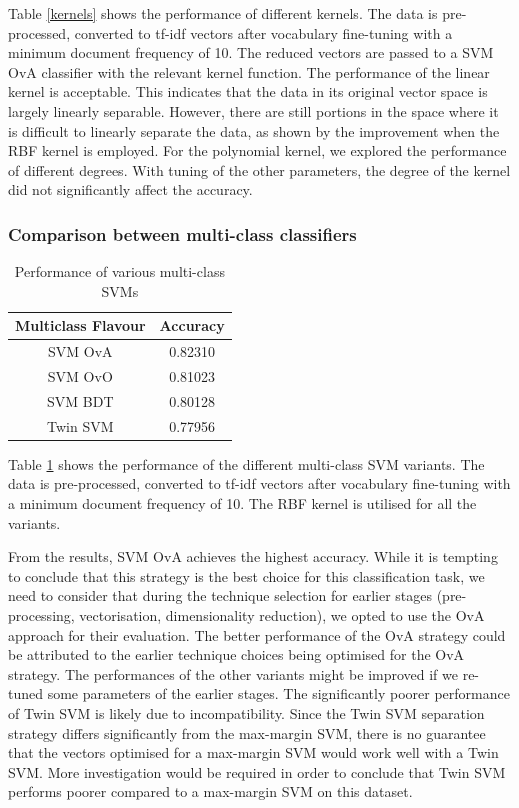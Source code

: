 \documentclass{article}
\begin{document}
Table \ref{kernels} shows the performance of different kernels. The data is pre-processed, converted to tf-idf vectors after vocabulary fine-tuning with a minimum document frequency of 10. The reduced vectors are passed to a SVM OvA classifier with the relevant kernel function. The performance of the linear kernel is acceptable. This indicates that the data in its original vector space is largely linearly separable. However, there are still portions in the space where it is difficult to linearly separate the data, as shown by the improvement when the RBF kernel is employed. For the polynomial kernel, we explored the performance of different degrees. With tuning of the other parameters, the degree of the kernel did not significantly affect the accuracy.

\subsubsection*{Comparison between multi-class classifiers}
\begin{table}[h]
\centering
\begin{tabular}{|c|c|}
\hline
\textbf{Multiclass Flavour} & \textbf{Accuracy} \\ \hline
SVM OvA            & 0.82310  \\ \hline
SVM OvO            & 0.81023  \\ \hline
SVM BDT            & 0.80128  \\ \hline
Twin SVM           & 0.77956  \\ \hline
\end{tabular}
\caption{Performance of various multi-class SVMs}
\label{multiclass}
\end{table}

Table \ref{multiclass} shows the performance of the different multi-class SVM variants. The data is pre-processed, converted to tf-idf vectors after vocabulary fine-tuning with a minimum document frequency of 10. The RBF kernel is utilised for all the variants.

From the results, SVM OvA achieves the highest accuracy. While it is tempting to conclude that this strategy is the best choice for this classification task, we need to consider that during the technique selection for earlier stages (pre-processing, vectorisation, dimensionality reduction), we opted to use the OvA approach for their evaluation. The better performance of the OvA strategy could be attributed to the earlier technique choices being optimised for the OvA strategy. The performances of the other variants might be improved if we re-tuned some parameters of the earlier stages. The significantly poorer performance of Twin SVM is likely due to incompatibility. Since the Twin SVM separation strategy differs significantly from the max-margin SVM, there is no guarantee that the vectors optimised for a max-margin SVM would work well with a Twin SVM. More investigation would be required in order to conclude that Twin SVM performs poorer compared to a max-margin SVM on this dataset.  
\end{document}

